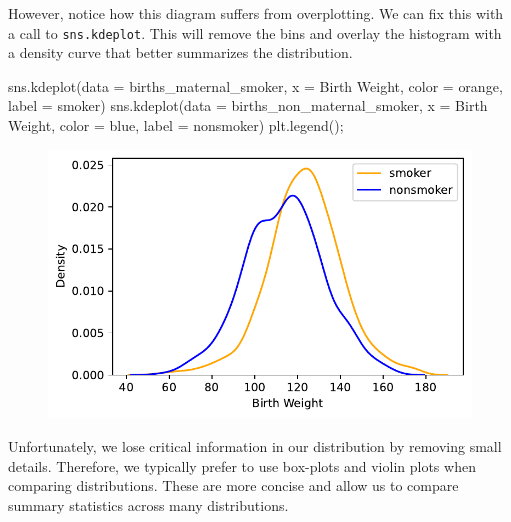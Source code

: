 \documentclass[
  letterpaper,
  DIV=11,
  numbers=noendperiod]{scrreprt}
\newenvironment{Shaded}{\begin{snugshade}}{\end{snugshade}}
\newcommand{\NormalTok}[1]{\textcolor[rgb]{0.00,0.23,0.31}{#1}}
\newcommand{\OperatorTok}[1]{\textcolor[rgb]{0.37,0.37,0.37}{#1}}
\newcommand{\StringTok}[1]{\textcolor[rgb]{0.13,0.47,0.30}{#1}}
\begin{document}
However, notice how this diagram suffers from overplotting. We can fix
this with a call to \texttt{sns.kdeplot}. This will remove the bins and
overlay the histogram with a density curve that better summarizes the
distribution.

\begin{Shaded}
\begin{Highlighting}[]
\NormalTok{sns.kdeplot(data }\OperatorTok{=}\NormalTok{ births\_maternal\_smoker, x }\OperatorTok{=} \StringTok{\textquotesingle{}Birth Weight\textquotesingle{}}\NormalTok{, color }\OperatorTok{=} \StringTok{\textquotesingle{}orange\textquotesingle{}}\NormalTok{, label }\OperatorTok{=} \StringTok{\textquotesingle{}smoker\textquotesingle{}}\NormalTok{)}
\NormalTok{sns.kdeplot(data }\OperatorTok{=}\NormalTok{ births\_non\_maternal\_smoker, x }\OperatorTok{=} \StringTok{\textquotesingle{}Birth Weight\textquotesingle{}}\NormalTok{, color }\OperatorTok{=} \StringTok{\textquotesingle{}blue\textquotesingle{}}\NormalTok{, label }\OperatorTok{=} \StringTok{\textquotesingle{}nonsmoker\textquotesingle{}}\NormalTok{)}
\NormalTok{plt.legend()}\OperatorTok{;}
\end{Highlighting}
\end{Shaded}

\begin{figure}[H]

{\centering \includegraphics{visualization_1/visualization_1_files/figure-pdf/cell-21-output-1.pdf}

}

\end{figure}

Unfortunately, we lose critical information in our distribution by
removing small details. Therefore, we typically prefer to use box-plots
and violin plots when comparing distributions. These are more concise
and allow us to compare summary statistics across many distributions.
\end{document}
